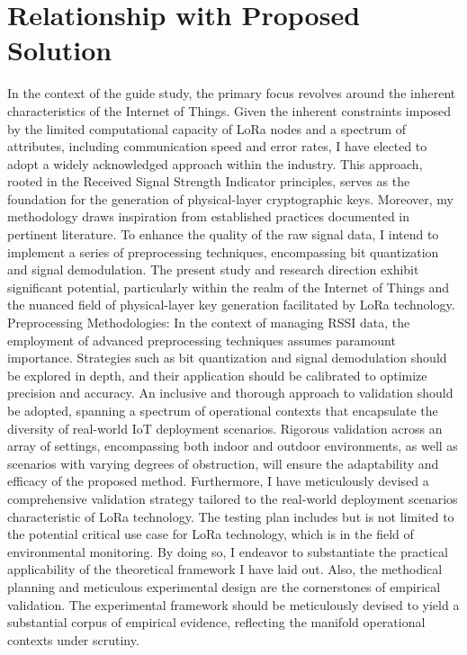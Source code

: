 \section{Relationship with Proposed Solution}
In the context of the guide study, the primary focus revolves around the inherent characteristics of the Internet of Things. Given the inherent constraints imposed by the limited computational capacity of LoRa nodes and a spectrum of attributes, including communication speed and error rates, I have elected to adopt a widely acknowledged approach within the industry. This approach, rooted in the Received Signal Strength Indicator principles, serves as the foundation for the generation of physical-layer cryptographic keys. Moreover, my methodology draws inspiration from established practices documented in pertinent literature. To enhance the quality of the raw signal data, I intend to implement a series of preprocessing techniques, encompassing bit quantization and signal demodulation.
The present study and research direction exhibit significant potential, particularly within the realm of the Internet of Things and the nuanced field of physical-layer key generation facilitated by LoRa technology. 
Preprocessing Methodologies: In the context of managing RSSI data, the employment of advanced preprocessing techniques assumes paramount importance. Strategies such as bit quantization and signal demodulation should be explored in depth, and their application should be calibrated to optimize precision and accuracy.
An inclusive and thorough approach to validation should be adopted, spanning a spectrum of operational contexts that encapsulate the diversity of real-world IoT deployment scenarios. Rigorous validation across an array of settings, encompassing both indoor and outdoor environments, as well as scenarios with varying degrees of obstruction, will ensure the adaptability and efficacy of the proposed method.
Furthermore, I have meticulously devised a comprehensive validation strategy tailored to the real-world deployment scenarios characteristic of LoRa technology. The testing plan includes but is not limited to the potential critical use case for LoRa technology, which is in the field of environmental monitoring. By doing so, I endeavor to substantiate the practical applicability of the theoretical framework I have laid out. Also, the methodical planning and meticulous experimental design are the cornerstones of empirical validation. The experimental framework should be meticulously devised to yield a substantial corpus of empirical evidence, reflecting the manifold operational contexts under scrutiny.
